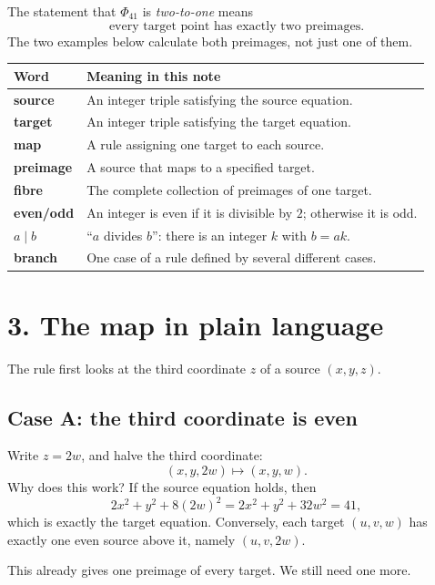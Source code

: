 \documentclass[11pt]{amsart}
\newcommand{\PhiMap}{\Phi_{41}}
\begin{document}
The statement that \(\PhiMap\) is \emph{two-to-one} means
\[
 \text{every target point has exactly two preimages.}
\]
The two examples below calculate both preimages, not just one of them.

\begin{center}
\renewcommand{\arraystretch}{1.25}
\begin{tabular}{@{}>{\bfseries}p{}p{}@{}}
\toprule
Word & Meaning in this note \\
\midrule
source & An integer triple satisfying the source equation. \\
target & An integer triple satisfying the target equation. \\
map & A rule assigning one target to each source. \\
preimage & A source that maps to a specified target. \\
fibre & The complete collection of preimages of one target. \\
even/odd & An integer is even if it is divisible by \(2\); otherwise it is odd. \\
\(a\mid b\) & ``\(a\) divides \(b\)'': there is an integer \(k\) with \(b=ak\). \\
branch & One case of a rule defined by several different cases. \\
\bottomrule
\end{tabular}
\end{center}

\section*{3. The map in plain language}

The rule first looks at the third coordinate \(z\) of a source
\((x,y,z)\).

\subsection*{Case A: the third coordinate is even}

Write \(z=2w\), and halve the third coordinate:
\[
 (x,y,2w)\longmapsto(x,y,w). \tag{even rule}
\]
Why does this work?  If the source equation holds, then
\[
 2x^2+y^2+8(2w)^2
 =2x^2+y^2+32w^2=41,
\]
which is exactly the target equation.  Conversely, each target \((u,v,w)\)
has exactly one even source above it, namely \((u,v,2w)\).

This already gives one preimage of every target.  We still need one more.
\end{document}
